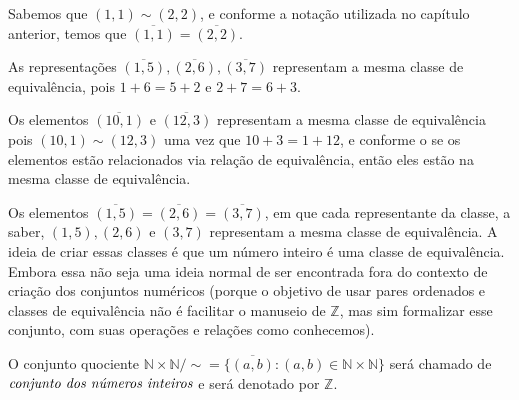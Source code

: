 \documentclass[../main.tex]{subfiles}
\begin{document}
\begin{ex}\label{int-ex-classesIguaisRepresentantesDiferentes}
    Sabemos que $(1,1) \sim (2,2)$, e conforme a notação utilizada no capítulo anterior, temos que $\overline{(1,1)} = \overline{(2,2)}$.
\end{ex}
\begin{ex}
    As representações $\overline{(1,5)}, \overline{(2,6)}, \overline{(3,7)}$ representam a mesma classe de equivalência, pois $1+6 = 5+2$ e $2+7=6+3$.
\end{ex}
\begin{ex}
    Os elementos $\overline{(10,1)}$ e $\overline{(12,3)}$ representam a mesma classe de equivalência pois $(10,1) \sim (12,3)$ uma vez que
    $10+3 = 1 + 12$, e conforme o  se os elementos estão relacionados via relação de equivalência, então eles estão na mesma classe de equivalência.
\end{ex}
\begin{ex}
    Os elementos $\overline{(1,5)} = \overline{(2,6)} = \overline{(3,7)}$, em que cada representante da classe, a saber, $(1,5), (2,6)$ e $(3,7)$ representam a mesma classe de equivalência. A ideia de criar essas classes é que um número inteiro é uma classe de equivalência. Embora essa não seja uma ideia normal de ser encontrada fora do contexto de criação dos conjuntos numéricos (porque o objetivo de usar pares ordenados e classes de equivalência não é facilitar o manuseio de $\mathbb{Z}$, mas sim formalizar esse conjunto, com suas operações e relações como conhecemos).
\end{ex}

\begin{defi}\label{int-def-conjuntoZ}
    O conjunto quociente $\mathbb{N} \times \mathbb{N} / \sim = \{ \overline{(a,b)}: (a,b) \in \mathbb{N} \times \mathbb{N}\}$ será chamado de $\emph{conjunto dos números inteiros}$ e será denotado por $\mathbb{Z}$.
\end{defi}
\end{document}
